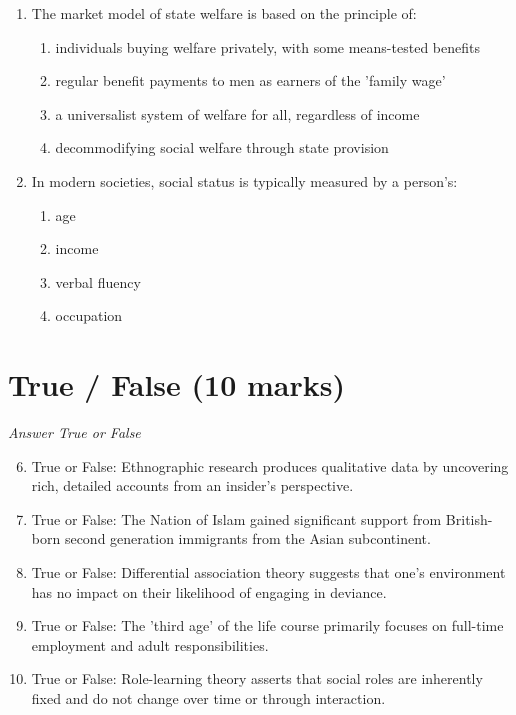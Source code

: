 \documentclass[12pt]{article}
\begin{document}
\begin{enumerate}[label=\arabic*.]
\item The market model of state welfare is based on the principle of:
\begin{enumerate}[label=(\alph*)]
    \item individuals buying welfare privately, with some means-tested benefits
    \item regular benefit payments to men as earners of the 'family wage'
    \item a universalist system of welfare for all, regardless of income
    \item decommodifying social welfare through state provision
\end{enumerate}
\item In modern societies, social status is typically measured by a person's:
\begin{enumerate}[label=(\alph*)]
    \item age
    \item income
    \item verbal fluency
    \item occupation
\end{enumerate}
\end{enumerate}

\section*{True / False (10 marks)}
\textit{Answer True or False}
\begin{enumerate}[label=\arabic*.]
\setcounter{enumi}{5}
\item True or False: Ethnographic research produces qualitative data by uncovering rich, detailed accounts from an insider's perspective.
\item True or False: The Nation of Islam gained significant support from British-born second generation immigrants from the Asian subcontinent.
\item True or False: Differential association theory suggests that one's environment has no impact on their likelihood of engaging in deviance.
\item True or False: The 'third age' of the life course primarily focuses on full-time employment and adult responsibilities.
\item True or False: Role-learning theory asserts that social roles are inherently fixed and do not change over time or through interaction.
\end{enumerate}
\end{document}
